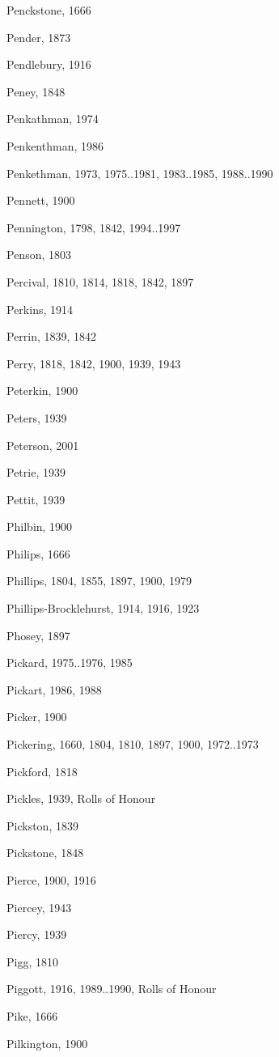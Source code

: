 \begin{theindex}
\item Penckstone, 1666
\item Pender, 1873
\item Pendlebury, 1916
\item Peney, 1848
\item Penkathman, 1974
\item Penkenthman, 1986
\item Penkethman, 1973, 1975..1981, 1983..1985, 1988..1990
\item Pennett, 1900
\item Pennington, 1798, 1842, 1994..1997
\item Penson, 1803
\item Percival, 1810, 1814, 1818, 1842, 1897
\item Perkins, 1914
\item Perrin, 1839, 1842
\item Perry, 1818, 1842, 1900, 1939, 1943
\item Peterkin, 1900
\item Peters, 1939
\item Peterson, 2001
\item Petrie, 1939
\item Pettit, 1939
\item Philbin, 1900
\item Philips, 1666
\item Phillips, 1804, 1855, 1897, 1900, 1979
\item Phillips-Brocklehurst, 1914, 1916, 1923
\item Phosey, 1897
\item Pickard, 1975..1976, 1985
\item Pickart, 1986, 1988
\item Picker, 1900
\item Pickering, 1660, 1804, 1810, 1897, 1900, 1972..1973
\item Pickford, 1818
\item Pickles, 1939, Rolls of Honour
\item Pickston, 1839
\item Pickstone, 1848
\item Pierce, 1900, 1916
\item Piercey, 1943
\item Piercy, 1939
\item Pigg, 1810
\item Piggott, 1916, 1989..1990, Rolls of Honour
\item Pike, 1666
\item Pilkington, 1900

\end{theindex}

